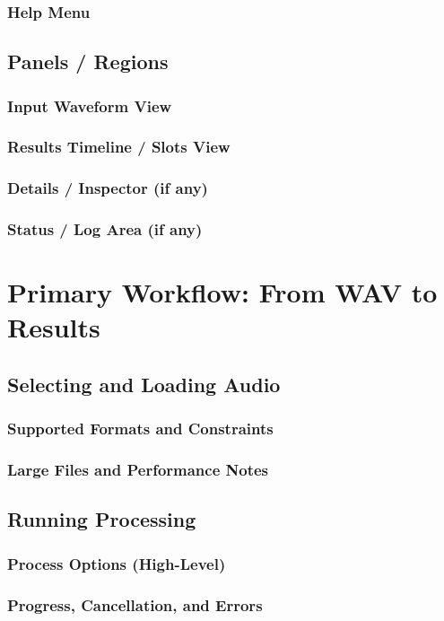 \documentclass[11pt]{report}
\begin{document}
    \subsection{Help Menu}
    \section{Panels / Regions}
    \subsection{Input Waveform View}
    \subsection{Results Timeline / Slots View}
    \subsection{Details / Inspector (if any)}
    \subsection{Status / Log Area (if any)}
    
    \chapter{Primary Workflow: From WAV to Results}
    \section{Selecting and Loading Audio}
    \subsection{Supported Formats and Constraints}
    \subsection{Large Files and Performance Notes}
    \section{Running Processing}
    \subsection{Process Options (High-Level)}
    \subsection{Progress, Cancellation, and Errors}
\end{document}
